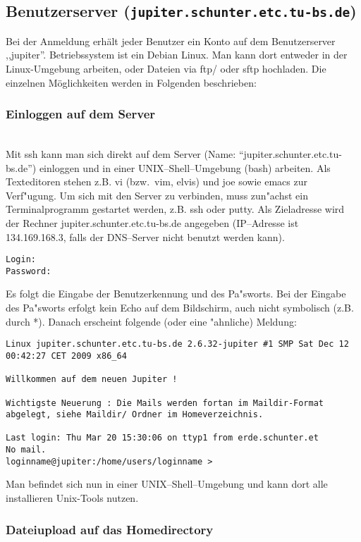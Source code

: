 
\subsection{Benutzerserver (\texttt{jupiter.schunter.etc.tu-bs.de})}
\label{benutzerserver}
Bei der Anmeldung erhält jeder Benutzer ein Konto auf dem
Benutzerserver ,,jupiter''. Betriebssystem ist ein Debian Linux. Man
kann dort entweder in der Linux-Umgebung arbeiten, oder Dateien via
ftp/ oder sftp hochladen. Die einzelnen Möglichkeiten werden in
Folgenden beschrieben:


\subsubsection{Einloggen auf dem Server} \ \\ 
Mit ssh  kann man sich direkt auf dem \glossar Server (Name: "`jupiter.schunter.etc.tu-bs.de"')
einloggen und in einer \glossar UNIX--Shell--Umgebung (bash) arbeiten. Als
Texteditoren stehen z.B. vi (bzw.\  vim, elvis) und joe sowie emacs zur
Verf"ugung. Um sich mit den Server zu verbinden, muss zun"achst ein Terminalprogramm gestartet werden,
z.B. \glossar ssh oder \glossar putty. Als Zieladresse wird der Rechner jupiter.schunter.etc.tu-bs.de angegeben
(IP--Adresse ist 134.169.168.3, falls der \glossar DNS--Server nicht benutzt
werden kann).
\begin{verbatim}
Login:
Password: 
\end{verbatim}
Es folgt die Eingabe der Benutzerkennung und des Pa"sworts. Bei der
Eingabe des Pa"sworts erfolgt kein Echo auf dem Bildschirm, auch nicht
symbolisch (z.B. durch *). Danach erscheint folgende (oder eine "ahnliche)
Meldung:
\begin{verbatim}
Linux jupiter.schunter.etc.tu-bs.de 2.6.32-jupiter #1 SMP Sat Dec 12 00:42:27 CET 2009 x86_64

Willkommen auf dem neuen Jupiter !

Wichtigste Neuerung : Die Mails werden fortan im Maildir-Format
abgelegt, siehe Maildir/ Ordner im Homeverzeichnis.

Last login: Thu Mar 20 15:30:06 on ttyp1 from erde.schunter.et
No mail.
loginname@jupiter:/home/users/loginname >
\end{verbatim}

Man befindet sich nun in einer \glossar UNIX--Shell--Umgebung und kann
dort alle installieren Unix-Tools nutzen.

\subsubsection{Dateiupload auf das Homedirectory}

